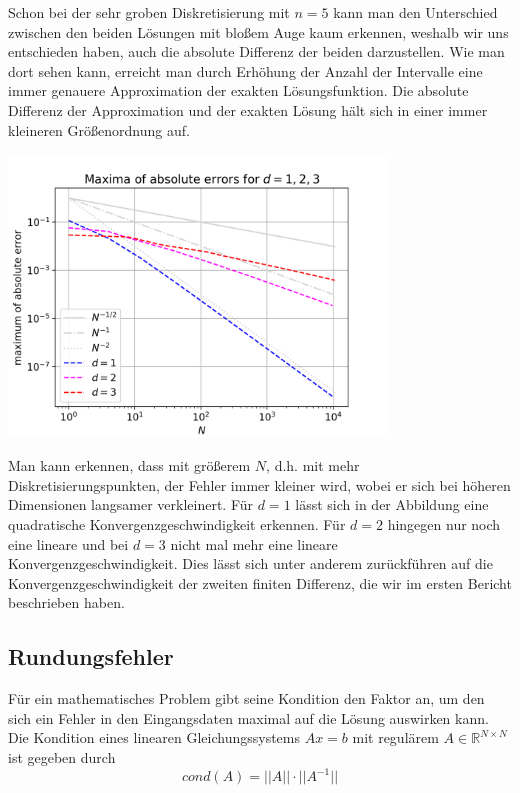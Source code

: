 \documentclass{scrartcl}
\begin{document}
Schon bei der sehr groben Diskretisierung mit $n=5$ kann man den Unterschied zwischen den beiden Lösungen mit bloßem Auge kaum erkennen, weshalb wir uns entschieden haben, auch die absolute Differenz der beiden darzustellen.
Wie man dort sehen kann, erreicht man durch Erhöhung der Anzahl der Intervalle eine immer genauere Approximation der exakten Lösungsfunktion. Die absolute Differenz der Approximation und der exakten Lösung hält sich in einer immer kleineren Größenordnung auf.

{
  \centering
    \includegraphics[width=0.75\textwidth]{Grafiken/loglogerr_d123_neu}
    \vspace{-0.2cm}
}
\vspace{0.5cm}

Man kann erkennen, dass mit größerem $N$, d.h. mit mehr Diskretisierungspunkten, der Fehler immer kleiner wird, wobei er sich bei höheren Dimensionen langsamer verkleinert.
Für $d=1$ lässt sich in der Abbildung eine quadratische Konvergenzgeschwindigkeit erkennen. Für $d=2$ hingegen nur noch eine lineare und bei $d=3$ nicht mal mehr eine lineare Konvergenzgeschwindigkeit. Dies lässt sich unter anderem zurückführen auf die Konvergenzgeschwindigkeit der zweiten finiten Differenz, die wir im ersten Bericht beschrieben haben.


\subsection{Rundungsfehler}
Für ein mathematisches Problem gibt seine Kondition den Faktor an, um den sich ein Fehler in den Eingangsdaten maximal auf die Lösung auswirken kann.
Die Kondition eines linearen Gleichungssystems $Ax = b$ mit regulärem $A\in\mathbb{R}^{N \times N}$ ist gegeben durch
\[cond(A) = ||A||\cdot||A^{-1}||\]\cite{tischendorf2019}
\end{document}
